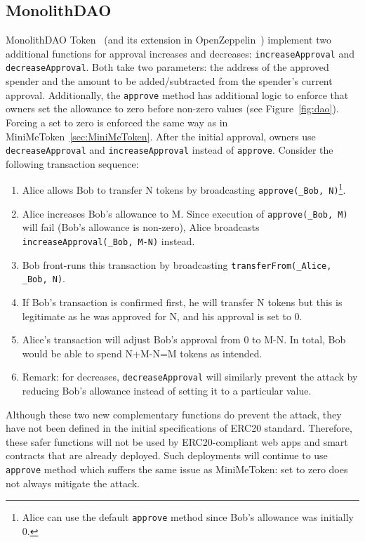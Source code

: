 \subsection{MonolithDAO}\label{sec:mdao}
MonolithDAO Token~\cite{Ref12} (and its extension in OpenZeppelin~\cite{Ref10}) implement two additional functions for approval increases and decreases: \texttt{increaseApproval} and \texttt{decreaseApproval}. Both take two parameters: the address of the approved spender and the amount to be added/subtracted from the spender's current approval. Additionally, the \texttt{approve} method has additional logic to enforce that owners set the allowance to zero before non-zero values (see Figure~\ref{fig:dao}). Forcing a set to zero is enforced the same way as in MiniMeToken~\ref{sec:MiniMeToken}. After the initial approval, owners use \texttt{decreaseApproval} and \texttt{increaseApproval} instead of \texttt{approve}. Consider the following transaction sequence:

\begin{enumerate}
	\item Alice allows Bob to transfer N tokens by broadcasting \texttt{approve(\_Bob, N)}\footnote{Alice can use the default \texttt{approve} method since Bob’s allowance was initially 0.}. 
	\item Alice increases Bob’s allowance to M. Since execution of \texttt{approve(\_Bob, M)} will fail (Bob's allowance is non-zero), Alice broadcasts \texttt{increaseApproval(\_Bob, M-N)} instead.
	\item Bob front-runs this transaction by broadcasting \texttt{transferFrom(\_Alice, \_Bob, N)}.
	\item If Bob's transaction is confirmed first, he will transfer N tokens but this is legitimate as he was approved for N, and his approval is set to 0.
	\item Alice's transaction will adjust Bob's approval from 0 to M-N. In total, Bob would be able to spend N+M-N=M tokens as intended.
	\item Remark: for decreases, \texttt{decreaseApproval} will similarly prevent the attack by reducing Bob's allowance instead of setting it to a particular value.
\end{enumerate}

Although these two new complementary functions do prevent the attack, they have not been defined in the initial specifications of ERC20 standard. Therefore, these safer functions will not be used by ERC20-compliant web apps and smart contracts that are already deployed. Such deployments will continue to use \texttt{approve} method which suffers the same issue as MiniMeToken: set to zero does not always mitigate the attack. 

